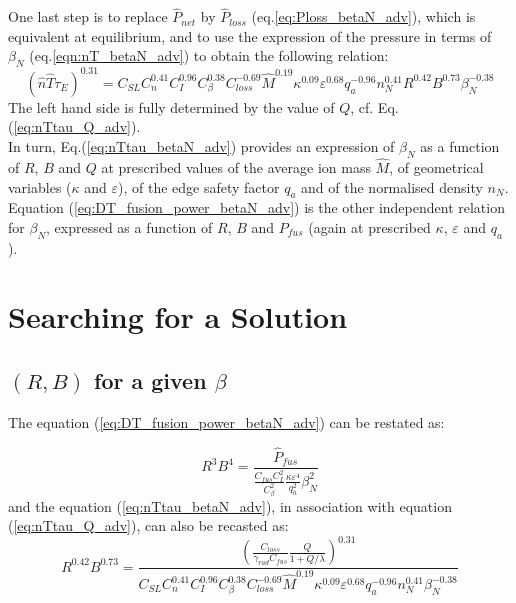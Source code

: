 One last step is to replace $\hat P_{net}$ by $\hat P_{loss}$ (eq.\ref{eq:Ploss_betaN_adv}), which is equivalent at equilibrium, and to use the expression of the pressure in terms of $\beta_N$ (eq.\ref{eqn:nT_betaN_adv}) to obtain the following relation:
\begin{equation}
\boxed{
	(\hat n\hat T\tau_E)^{0.31} 
	= 
	C_{SL} C_n^{0.41} C_I^{0.96} C_\beta^{0.38} 
	C_{loss}^{-0.69}
	\hat M^{0.19} \kappa^{0.09} \varepsilon^{0.68} q_a^{-0.96}
	n_N^{0.41} R^{0.42} B^{0.73} \beta_N^{-0.38}
}
\label{eq:nTtau_betaN_adv}
\end{equation}
The left hand side is fully determined by the value of $Q$, cf. Eq.(\ref{eq:nTtau_Q_adv}). \\

In turn, Eq.(\ref{eq:nTtau_betaN_adv}) provides an expression of $\beta_N$ as a function of $R$, $B$ and $Q$ at prescribed values of the average ion mass $\hat M$, of geometrical variables ($\kappa$ and $\varepsilon$), of the edge safety factor $q_a$ and of the normalised density $n_N$.
Equation (\ref{eq:DT_fusion_power_betaN_adv}) is the other independent relation for $\beta_N$, expressed as a function of $R$, $B$ and $P_{fus}$ (again at prescribed $\kappa$, $\varepsilon$ and $q_a$).




\chapter{Searching for a Solution}\margintoc
\section{$(R,B)$ for a given $\beta$}
The equation (\ref{eq:DT_fusion_power_betaN_adv}) can be restated as:

\begin{equation}
	R^3 B^4 
	=
	\frac{
		\hat P_{fus}
	}{
		\frac{C_{fus}C_I^2}{C_\beta^2} \frac{\kappa \varepsilon^4}{q_a^2} 
		\beta_N^2 
	}
\end{equation}
and the equation (\ref{eq:nTtau_betaN_adv}), in association with equation (\ref{eq:nTtau_Q_adv}), can also be recasted as:
\begin{equation}
R^{0.42} B^{0.73}
=
\frac{
	\left( 
		\frac{C_{loss}}{\gamma_{rad} C_{fus}} \frac{Q}{1+Q/\lambda} 
	\right)^{0.31} 
}{
	C_{SL} C_n^{0.41} C_I^{0.96} C_\beta^{0.38} 
C_{loss}^{-0.69}
\hat M^{0.19} \kappa^{0.09} \varepsilon^{0.68} q_a^{-0.96}
n_N^{0.41}  \beta_N^{-0.38}
}
\end{equation}

